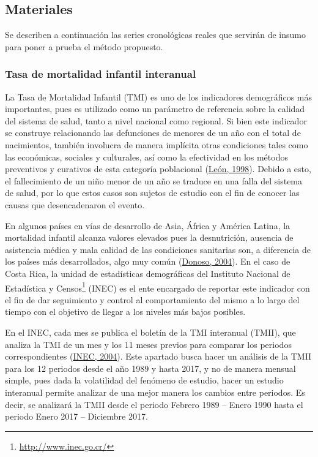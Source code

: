 \documentclass[
]{article}
\begin{document}
\subsection{Materiales}

Se describen a continuación las series cronológicas reales que servirán
de insumo para poner a prueba el método propuesto.

\subsubsection{Tasa de mortalidad infantil interanual}

La Tasa de Mortalidad Infantil (TMI) es uno de los indicadores
demográficos más importantes, pues es utilizado como un parámetro de
referencia sobre la calidad del sistema de salud, tanto a nivel nacional
como regional. Si bien este indicador se construye relacionando las
defunciones de menores de un año con el total de nacimientos, también
involucra de manera implícita otras condiciones tales como las
económicas, sociales y culturales, así como la efectividad en los
métodos preventivos y curativos de esta categoría poblacional
(\protect\hyperlink{ref-leon}{León, 1998}). Debido a esto, el
fallecimiento de un niño menor de un año se traduce en una falla del
sistema de salud, por lo que estos casos son sujetos de estudio con el
fin de conocer las causas que desencadenaron el evento.

En algunos países en vías de desarrollo de Asia, África y América
Latina, la mortalidad infantil alcanza valores elevados pues la
desnutrición, ausencia de asistencia médica y mala calidad de las
condiciones sanitarias son, a diferencia de los países más
desarrollados, algo muy común (\protect\hyperlink{ref-donoso}{Donoso,
2004}). En el caso de Costa Rica, la unidad de estadísticas demográficas
del Instituto Nacional de Estadística y Censos\footnote{\url{http://www.inec.go.cr/}}
(INEC) es el ente encargado de reportar este indicador con el fin de dar
seguimiento y control al comportamiento del mismo a lo largo del tiempo
con el objetivo de llegar a los niveles más bajos posibles.

En el INEC, cada mes se publica el boletín de la TMI interanual (TMII),
que analiza la TMI de un mes y los 11 meses previos para comparar los
periodos correspondientes (\protect\hyperlink{ref-infantiles}{INEC,
2004}). Este apartado busca hacer un análisis de la TMII para los 12
periodos desde el año 1989 y hasta 2017, y no de manera mensual simple,
pues dada la volatilidad del fenómeno de estudio, hacer un estudio
interanual permite analizar de una mejor manera los cambios entre
periodos. Es decir, se analizará la TMII desde el periodo Febrero 1989
-- Enero 1990 hasta el periodo Enero 2017 -- Diciembre 2017.
\end{document}
